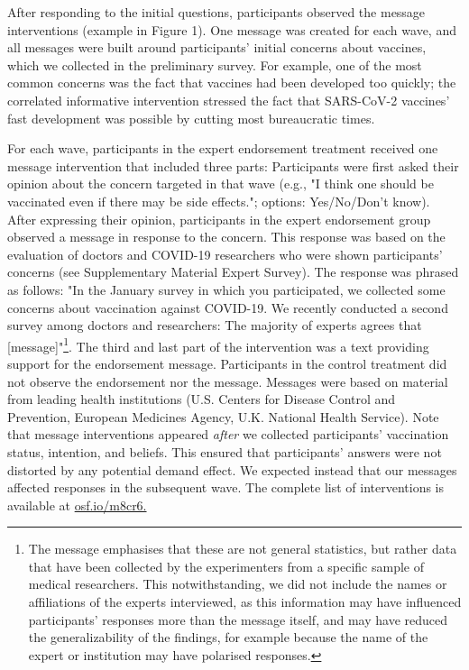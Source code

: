 \documentclass[authordate, empirical]{jote-new-article}
\begin{document}
After responding to the initial questions, participants observed the message interventions (example in Figure 1). One message was created for each wave, and all messages were built around participants' initial concerns about vaccines, which we collected in the preliminary survey. For example, one of the most common concerns was the fact that vaccines had been developed too quickly; the correlated informative intervention stressed the fact that SARS-CoV-2 vaccines' fast development was possible by cutting most bureaucratic times.











For each wave, participants in the expert endorsement treatment received one message intervention that included three parts: Participants were first asked their opinion about the concern targeted in that wave (e.g., "I think one should be vaccinated even if there may be side effects."; options: Yes/No/Don't know). After expressing their opinion, participants in the expert endorsement group observed a message in response to the concern. This response was based on the evaluation of doctors and COVID-19 researchers who were shown participants' concerns (see Supplementary Material Expert Survey). The response was phrased as follows: "In the January survey in which you participated, we collected some concerns about vaccination against COVID-19. We recently conducted a second survey among doctors and researchers: The majority of experts agrees that [message]"\footnote{ The message emphasises that these are not general statistics, but rather data that have been collected by the experimenters from a specific sample of medical researchers. This notwithstanding, we did not include the names or affiliations of the experts interviewed, as this information may have influenced participants' responses more than the message itself, and may have reduced the generalizability of the findings, for example because the name of the expert or institution may have polarised responses.}. The third and last part of the intervention was a text providing support for the endorsement message. Participants in the control treatment did not observe the endorsement nor the message. Messages were based on material from leading health institutions (U.S. Centers for Disease Control and Prevention, European Medicines Agency, U.K. National Health Service). Note that message interventions appeared \emph{after }we collected participants' vaccination status, intention, and beliefs. This ensured that participants' answers were not distorted by any potential demand effect. We expected instead that our messages affected responses in the subsequent wave. The complete list of interventions is available at \href{https://osf.io/m8cr6/}{osf.io/m8cr6.}
\end{document}
